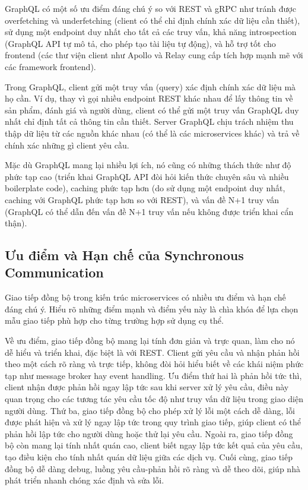GraphQL có một số ưu điểm đáng chú ý so với REST và gRPC như tránh được overfetching và underfetching (client có thể chỉ định chính xác dữ liệu cần thiết), sử dụng một endpoint duy nhất cho tất cả các truy vấn, khả năng introspection (GraphQL API tự mô tả, cho phép tạo tài liệu tự động), và hỗ trợ tốt cho frontend (các thư viện client như Apollo và Relay cung cấp tích hợp mạnh mẽ với các framework frontend).

Trong GraphQL, client gửi một truy vấn (query) xác định chính xác dữ liệu mà họ cần. Ví dụ, thay vì gọi nhiều endpoint REST khác nhau để lấy thông tin về sản phẩm, đánh giá và người dùng, client có thể gửi một truy vấn GraphQL duy nhất chỉ định tất cả thông tin cần thiết. Server GraphQL chịu trách nhiệm thu thập dữ liệu từ các nguồn khác nhau (có thể là các microservices khác) và trả về chính xác những gì client yêu cầu.

Mặc dù GraphQL mang lại nhiều lợi ích, nó cũng có những thách thức như độ phức tạp cao (triển khai GraphQL API đòi hỏi kiến thức chuyên sâu và nhiều boilerplate code), caching phức tạp hơn (do sử dụng một endpoint duy nhất, caching với GraphQL phức tạp hơn so với REST), và vấn đề N+1 truy vấn (GraphQL có thể dẫn đến vấn đề N+1 truy vấn nếu không được triển khai cẩn thận).

\subsection{Ưu điểm và Hạn chế của Synchronous Communication}
Giao tiếp đồng bộ trong kiến trúc microservices có nhiều ưu điểm và hạn chế đáng chú ý. Hiểu rõ những điểm mạnh và điểm yếu này là chìa khóa để lựa chọn mẫu giao tiếp phù hợp cho từng trường hợp sử dụng cụ thể.

Về ưu điểm, giao tiếp đồng bộ mang lại tính đơn giản và trực quan, làm cho nó dễ hiểu và triển khai, đặc biệt là với REST. Client gửi yêu cầu và nhận phản hồi theo một cách rõ ràng và trực tiếp, không đòi hỏi hiểu biết về các khái niệm phức tạp như message broker hay event handling. Ưu điểm thứ hai là phản hồi tức thì, client nhận được phản hồi ngay lập tức sau khi server xử lý yêu cầu, điều này quan trọng cho các tương tác yêu cầu tốc độ như truy vấn dữ liệu trong giao diện người dùng. Thứ ba, giao tiếp đồng bộ cho phép xử lý lỗi một cách dễ dàng, lỗi được phát hiện và xử lý ngay lập tức trong quy trình giao tiếp, giúp client có thể phản hồi lập tức cho người dùng hoặc thử lại yêu cầu. Ngoài ra, giao tiếp đồng bộ còn mang lại tính nhất quán cao, client biết ngay lập tức kết quả của yêu cầu, tạo điều kiện cho tính nhất quán dữ liệu giữa các dịch vụ. Cuối cùng, giao tiếp đồng bộ dễ dàng debug, luồng yêu cầu-phản hồi rõ ràng và dễ theo dõi, giúp nhà phát triển nhanh chóng xác định và sửa lỗi.

